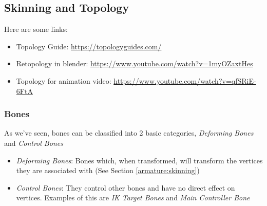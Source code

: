 \documentclass{article}
\begin{document}
\subsection{Skinning and Topology}
Here are some links:
\begin{itemize}[noitemsep, topsep=0pt]
    \item Topology Guide: \href{https://topologyguides.com/}{https://topologyguides.com/}
    \item Retopology in blender: \href{https://www.youtube.com/watch?v=1myOZaxtHes}{https://www.youtube.com/watch?v=1myOZaxtHes}
    \item Topology for animation video: \href{https://www.youtube.com/watch?v=qfSRiE-6FtA}{https://www.youtube.com/watch?v=qfSRiE-6FtA}
\end{itemize}

\subsubsection{Bones}
As we've seen, bones can be classified into 2 basic categories, \textit{Deforming Bones} and \textit{Control Bones}
\begin{itemize}[noitemsep, topsep=0pt]
    \item \textit{Deforming Bones}: Bones which, when transformed, will transform the vertices they are associated with (See Section \ref{armature:skinning})
    \item \textit{Control Bones}: They control other bones and have no direct effect on vertices. Examples of this are \textit{IK Target Bones} and \textit{Main Controller Bone}
\end{itemize}
\end{document}

